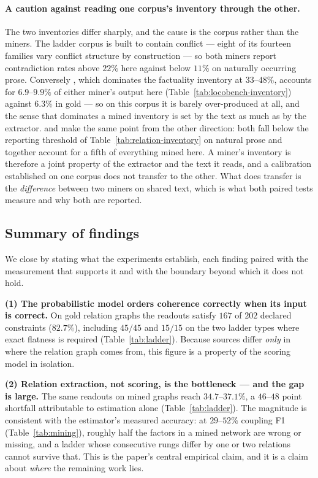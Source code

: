 \paragraph{A caution against reading one corpus's inventory through the other.} The two inventories
differ sharply, and the cause is the corpus rather than the miners. The ladder corpus is built to
contain conflict --- eight of its fourteen families vary conflict structure by construction --- so both
miners report contradiction rates above $22\%$ here against below $11\%$ on naturally occurring prose.
Conversely , which dominates the factuality inventory at $33$--$48\%$, accounts for
$6.9$--$9.9\%$ of either miner's output here (Table~\ref{tab:locobench-inventory}) against $6.3\%$ in
gold --- so on this corpus it is barely over-produced at all, and the sense that dominates a mined
inventory is set by the text as much as by the extractor.  and 
make the same point from the other direction: both fall below the reporting threshold of
Table~\ref{tab:relation-inventory} on natural prose and together account for a fifth of everything mined
here. A miner's inventory is therefore a joint property of the
extractor and the text it reads, and a calibration established on one corpus does not transfer to the
other. What does transfer is the \emph{difference} between two miners on shared text, which is what both
paired tests measure and why both are reported.

\subsection{Summary of findings}
\label{sec-summary}

We close by stating what the experiments establish, each finding paired with the measurement that supports it and
with the boundary beyond which it does not hold.

\textbf{(1) The probabilistic model orders coherence correctly when its input is correct.} On gold relation
graphs the readouts satisfy $167$ of $202$ declared constraints ($82.7\%$), including $45/45$ and $15/15$ on the
two ladder types where exact flatness is required (Table~\ref{tab:ladder}). Because sources differ \emph{only} in
where the relation graph comes from, this figure is a property of the scoring model in isolation.

\textbf{(2) Relation extraction, not scoring, is the bottleneck --- and the gap is large.} The same readouts on
mined graphs reach $34.7$--$37.1\%$, a $46$--$48$ point shortfall attributable to estimation alone
(Table~\ref{tab:ladder}). The magnitude is consistent with the estimator's measured accuracy: at $29$--$52\%$
coupling F1 (Table~\ref{tab:mining}), roughly half the factors in a mined network are wrong or missing, and a
ladder whose consecutive rungs differ by one or two relations cannot survive that. This is the paper's central
empirical claim, and it is a claim about \emph{where} the remaining work lies.

